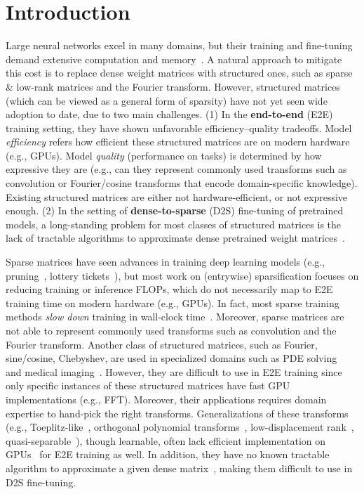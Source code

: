 \section{Introduction}
\label{sec:intro}



Large neural networks excel in many domains, but their training and fine-tuning demand extensive computation and memory~\citep{kaplan2020scaling}.
A natural approach to mitigate this cost is to replace dense weight matrices with structured ones, such as sparse \& low-rank matrices and the Fourier transform.
However, structured matrices (which can be viewed as a general form of sparsity) have not yet seen wide adoption to date, due to two main challenges.
(1) In the \textbf{end-to-end} (E2E) training setting, they have shown unfavorable efficiency--quality tradeoffs.
Model \emph{efficiency} refers how efficient these structured matrices are on modern hardware (e.g., GPUs).
Model \emph{quality} (performance on tasks) is determined by how expressive they are (e.g., can they represent commonly used transforms such as convolution or Fourier/cosine transforms that encode domain-specific knowledge).
Existing structured matrices are either not hardware-efficient, or not expressive enough.
(2) In the setting of \textbf{dense-to-sparse} (D2S) fine-tuning of pretrained models, 
a long-standing problem for most classes of structured matrices is the lack of tractable algorithms to approximate dense pretrained weight matrices~\citep{pan2012structured}.










Sparse matrices have seen advances in training deep learning models (e.g., pruning~\citep{han2015deep}, lottery tickets~\citep{frankle2018lottery}), but most work on (entrywise) sparsification focuses on reducing training or inference FLOPs, which do not necessarily map to E2E training time on modern hardware (e.g., GPUs).
In fact, most sparse training methods \emph{slow down} training in wall-clock time~\citep{gale2019state, hooker2020hardware}.
Moreover, sparse matrices are not able to represent commonly used transforms such as convolution and the Fourier transform.
Another class of structured matrices, such as Fourier, sine/cosine, Chebyshev, are used in specialized domains such as PDE solving~\citep{trefethen2000spectral} and medical imaging~\citep{hsieh2003computed}.
However, they are difficult to use in E2E training since only specific instances of these structured matrices have fast GPU implementations (e.g., FFT). Moreover, their applications requires domain expertise to hand-pick the right transforms.
Generalizations of these transforms (e.g., Toeplitz-like~\citep{sindhwani2015structured}, orthogonal polynomial transforms~\citep{driscoll1997fast}, low-displacement rank~\citep{kailath1979displacement}, quasi-separable~\citep{eidelman1999new}), though learnable, often lack efficient implementation on GPUs~\citep{thomas2018learning} for E2E training as well.
In addition, they have no known tractable algorithm to approximate a given dense matrix~\citep{pan2012structured}, making them difficult to use in D2S fine-tuning.




